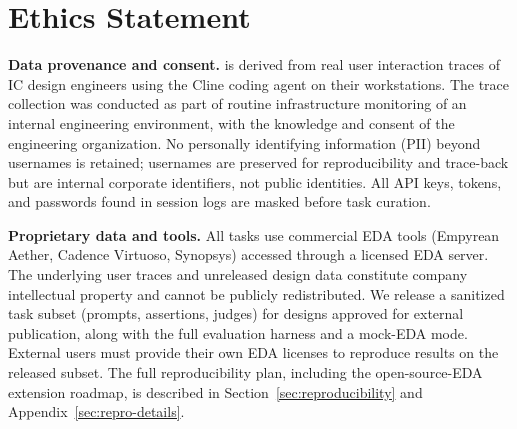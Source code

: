 \section*{Ethics Statement}
\label{sec:ethics}


\textbf{Data provenance and consent.} \bench{} is derived from real user interaction traces of IC design engineers using the Cline coding agent on their workstations. The trace collection was conducted as part of routine infrastructure monitoring of an internal engineering environment, with the knowledge and consent of the engineering organization. No personally identifying information (PII) beyond usernames is retained; usernames are preserved for reproducibility and trace-back but are internal corporate identifiers, not public identities. All API keys, tokens, and passwords found in session logs are masked before task curation.

\textbf{Proprietary data and tools.} All tasks use commercial EDA tools (Empyrean Aether, Cadence Virtuoso, Synopsys) accessed through a licensed EDA server. The underlying user traces and unreleased design data constitute company intellectual property and cannot be publicly redistributed. We release a sanitized task subset (prompts, assertions, judges) for designs approved for external publication, along with the full evaluation harness and a mock-EDA mode. External users must provide their own EDA licenses to reproduce results on the released subset. The full reproducibility plan, including the open-source-EDA extension roadmap, is described in Section~\ref{sec:reproducibility} and Appendix~\ref{sec:repro-details}.

